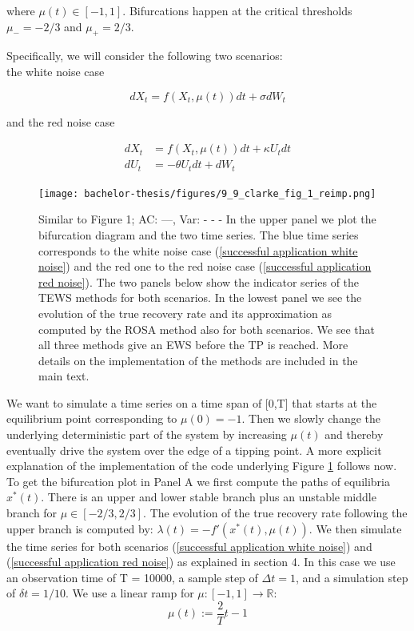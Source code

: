\documentclass[%
thesis=student,%
coverpage=false,%
titlepage=false,%
headmarks=true, %
english,%
font=libertine, %
math=newpxtx, %
BCOR=5mm,%
coverBCOR=11mm%
]{tumbook}
\begin{document}
where $\mu(t) \in [-1,1]$. Bifurcations happen at the critical thresholds $\mu_{-} = -2/3$ and $\mu_{+} = 2/3$.

Specifically, we will consider the following two scenarios: \\
    the white noise case
    
    \begin{equation}  
    dX_{t} = f(X_{t},\mu(t))dt + \sigma dW_{t}
    \label{successful application white noise}
    \end{equation}


and the red noise case

    \begin{equation}
        \begin{aligned}
            dX_{t} & = f(X_{t},\mu(t))dt + \kappa U_{t}dt \\
            dU_{t} & = -\theta U_{t} dt + dW_{t}
        \end{aligned}
        \label{successful application red noise}
    \end{equation}



\begin{figure}
    \centering
    \texttt{[image: bachelor-thesis/figures/9\_9\_clarke\_fig\_1\_reimp.png]}
    \caption{Similar to \cite{Clarke:2023} Figure 1; AC: ---, Var: - - -
    In the upper panel we plot the bifurcation diagram and the two time series. The blue time series corresponds to the white noise case (\ref{successful application white noise}) and the red one to the red noise case (\ref{successful application red noise}). The two panels below show the indicator series of the TEWS methods for both scenarios. In the lowest panel we see the evolution of the true recovery rate and its approximation as computed by the ROSA method also for both scenarios. We see that all three methods give an EWS before the TP is reached. More details on the implementation of the methods are included in the main text.
    }
    \label{success_of_trad_ews_and_rosa}
\end{figure}

We want to simulate a time series on a time span of [0,T] that starts at the equilibrium point corresponding to $\mu(0) = -1$. Then we slowly change the underlying deterministic part of the system by increasing $\mu(t)$ and thereby eventually drive the system over the edge of a tipping point. A more explicit explanation of the implementation of the code underlying Figure \ref{success_of_trad_ews_and_rosa} follows now. To get the bifurcation plot in Panel A we first compute the paths of equilibria $x^{*}(t)$. There is an upper and lower stable branch plus an unstable middle branch for $\mu \in [-2/3,2/3]$. The evolution of the true recovery rate following the upper branch is computed by: $\lambda(t) = -f'(x^{*}(t),\mu(t))$. We then simulate the time series for both scenarios (\ref{successful application white noise}) and (\ref{successful application red noise}) as explained in section 4. In this case we use an observation time of T = 10000, a sample step of $\Delta t = 1$, and a simulation step of $\delta t = 1/10$. We use a linear ramp for $\mu:  [-1,1] \rightarrow \mathbb{R}$:
\[
\mu(t) := \frac{2}{T}t-1
\]
\end{document}
